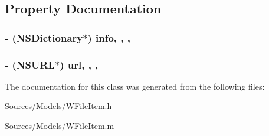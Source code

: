 \subsection{Property Documentation}
\hypertarget{interface_w_file_item_a6500a1eedb6eb92f62dfd0080ab283b0}{
\subsubsection[{info}]{\setlength{\rightskip}{0pt plus 5cm}-\/ (N\-S\-Dictionary$\ast$) info\hspace{0.3cm}{\ttfamily [read]}, {\ttfamily [write]}, {\ttfamily [nonatomic]}, {\ttfamily [retain]}}}\label{interface_w_file_item_a6500a1eedb6eb92f62dfd0080ab283b0}
\hypertarget{interface_w_file_item_a589a9e694fcbf825f64b4d80512c1675}{
\subsubsection[{url}]{\setlength{\rightskip}{0pt plus 5cm}-\/ (N\-S\-U\-R\-L$\ast$) url\hspace{0.3cm}{\ttfamily [read]}, {\ttfamily [write]}, {\ttfamily [nonatomic]}, {\ttfamily [retain]}}}\label{interface_w_file_item_a589a9e694fcbf825f64b4d80512c1675}


The documentation for this class was generated from the following files\-:\begin{DoxyCompactItemize}
\item 
Sources/\-Models/\hyperlink{_w_file_item_8h}{W\-File\-Item.\-h}\item 
Sources/\-Models/\hyperlink{_w_file_item_8m}{W\-File\-Item.\-m}\end{DoxyCompactItemize}
